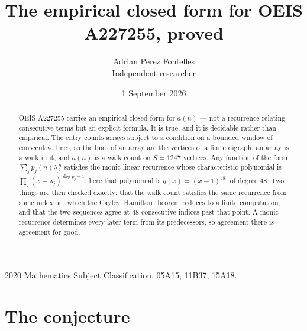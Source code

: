 \documentclass[11pt,a4paper]{article}
\title{The empirical closed form for OEIS A227255, proved}
\author{Adrian Perez Fontelles\\ \small Independent researcher}
\date{1 September 2026}
\theoremstyle{plain}
\theoremstyle{definition}
\begin{document}
\maketitle

\begin{abstract}
OEIS A227255 carries an empirical closed form for $a(n)$ --- not a recurrence relating
consecutive terms but an explicit formula. It is true, and it is decidable rather than
empirical. The entry counts arrays subject to a condition on a bounded window of consecutive lines, so the lines of an array are the
vertices of a finite digraph, an array is a walk in it, and $a(n)$ is a walk count on
$S=1247$ vertices. Any function of the form $\sum_j p_j(n)\lambda_j^{\,n}$ satisfies the
monic linear recurrence whose characteristic polynomial is
$\prod_j(x-\lambda_j)^{\deg p_j+1}$; here that polynomial is $q(x)=(x-1)^{48}$, of degree
$48$. Two things are then checked exactly: that the walk count satisfies the same
recurrence from some index on, which the Cayley--Hamilton theorem reduces to a finite
computation, and that the two sequences agree at $48$ consecutive indices past that
point. A monic recurrence determines every later term from its predecessors, so agreement
there is agreement for good.
\end{abstract}

\noindent\small 2020 Mathematics Subject Classification. 05A15, 11B37, 15A18.\normalsize

\section{The conjecture}
\end{document}
